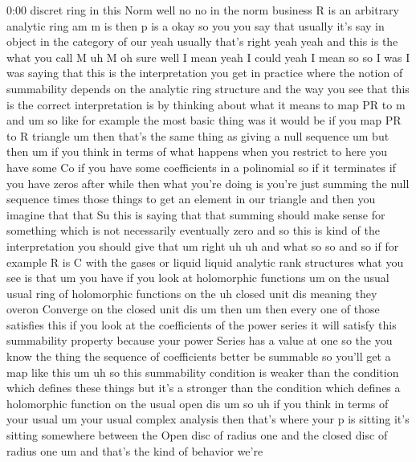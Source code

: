 \begin{unfinished}{0:00}
discret  ring  in  this  Norm  well  no  no  in
the  norm  business  R  is  an  arbitrary
analytic  ring  am  m  is  then  p  is
a
okay  so  you  you  say  that  usually  it's
say  in
object  in  the  category  of  our  yeah
usually  that's  right  yeah  yeah  and  this
is  the  what  you  call  M  uh  M  oh  sure  well
I  mean  yeah  I  could  yeah  I  mean  so  so  I
was  I  was  saying  that  this  is  the
interpretation  you  get  in  practice  where
the  notion  of  summability  depends  on  the
analytic  ring  structure  and  the  way  you
see  that  this  is  the  correct
interpretation  is  by  thinking  about  what
it  means  to  map  PR  to  m
and
um  so  like  for  example  the  most  basic
thing  was  it  would  be  if  you  map  PR  to  R
triangle  um  then  that's  the  same  thing
as  giving  a  null  sequence
um  but  then  um  if  you  think  in  terms  of
what  happens  when  you  restrict  to  here
you  have  some  Co  if  you  have  some
coefficients  in  a  polinomial  so  if  it
terminates  if  you  have  zeros  after  while
then  what  you're  doing  is  you're  just
summing  the  null  sequence  times  those
things  to  get  an  element  in  our  triangle
and  then  you  imagine  that  that  Su  this
is  saying  that  that  summing  should  make
sense  for  something  which  is  not
necessarily  eventually  zero  and  so  this
is  kind  of  the  interpretation  you  should
give  that
um  right
uh  uh  and  what  so  so  and  so  if  for
example  R  is  C  with  the  gases  or  liquid
liquid  analytic  rank  structures  what  you
see  is  that
um  you  have  if  you  look  at  holomorphic
functions  um  on  the  usual  usual  ring  of
holomorphic  functions  on  the
uh  closed  unit  dis  meaning  they  overon
Converge  on  the  closed  unit  dis
um
then
um  then  every  one  of  those  satisfies
this  if  you  look  at  the  coefficients  of
the  power  series  it  will  satisfy  this
summability  property  because  your  power
Series  has  a  value  at  one  so  the  you
know  the  thing  the  sequence  of
coefficients  better  be  summable  so
you'll  get  a  map  like  this  um  uh  so  this
summability  condition
is  weaker  than  the  condition  which
defines  these  things  but  it's  a  stronger
than  the  condition  which  defines  a
holomorphic  function  on  the  usual  open
dis  um
so  uh  if  you  think  in  terms  of  your
usual
um  your  usual  complex  analysis  then
that's  where  your  p  is  sitting  it's
sitting  somewhere  between  the  Open  disc
of  radius  one  and  the  closed  disc  of
radius
one
um  and  that's  the  kind  of  behavior  we're

\end{unfinished}
